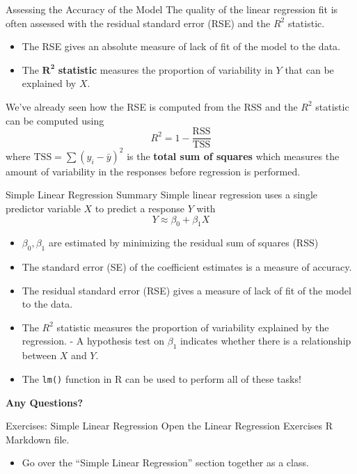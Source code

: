 \documentclass[
  ignorenonframetext,
  aspectratio=169,
]{beamer}
\providecommand{\tightlist}{%
  \setlength{\itemsep}{0pt}\setlength{\parskip}{0pt}}\usepackage{longtable,booktabs,array}
\begin{document}
\begin{frame}{Assessing the Accuracy of the Model}
\protect\hypertarget{assessing-the-accuracy-of-the-model}{}
The quality of the linear regression fit is often assessed with the
residual standard error (RSE) and the \(R^2\) statistic.

\begin{itemize}
\tightlist
\item
  The RSE gives an absolute
  \alert{measure of lack of fit of the model to the data.}
\item
  The \(\mathbf{R^2}\) \textbf{statistic} measures
  \alert{the proportion of variability in $Y$ that can be explained by $X$.}
\end{itemize}

We've already seen how the RSE is computed from the RSS and the \(R^2\)
statistic can be computed using \[
R^{2}=1-\frac{\mathrm{RSS}}{\mathrm{TSS}}
\] where \(\mathrm{TSS}=\sum\left(y_{i}-\bar{y}\right)^{2}\) is the
\textbf{total sum of squares} which measures the amount of variability
in the responses before regression is performed.
\end{frame}

\begin{frame}[fragile]{Simple Linear Regression Summary}
\protect\hypertarget{simple-linear-regression-summary}{}
Simple linear regression uses a single predictor variable \(X\) to
predict a response \(Y\) with \[
Y \approx \beta_{0}+\beta_{1} X
\]

\begin{itemize}
\item
  \(\beta_{0}, \beta_{1}\) are estimated by minimizing the residual sum
  of squares (RSS)
\item
  The standard error (SE) of the coefficient estimates is a measure of
  accuracy.
\item
  The residual standard error (RSE) gives a measure of lack of fit of
  the model to the data.
\item
  The \(R^2\) statistic measures the proportion of variability explained
  by the regression. - A hypothesis test on \(\beta_1\) indicates
  whether there is a relationship between \(X\) and \(Y\).
\item
  The \texttt{lm()} function in R can be used to perform all of these
  tasks!
\end{itemize}

\textbf{Any Questions?}
\end{frame}

\begin{frame}{Exercises: Simple Linear Regression}
\protect\hypertarget{exercises-simple-linear-regression}{}
Open the Linear Regression Exercises R Markdown file.

\begin{itemize}
\tightlist
\item
  Go over the ``Simple Linear Regression'' section together as a class.
\end{itemize}
\end{frame}
\end{document}
